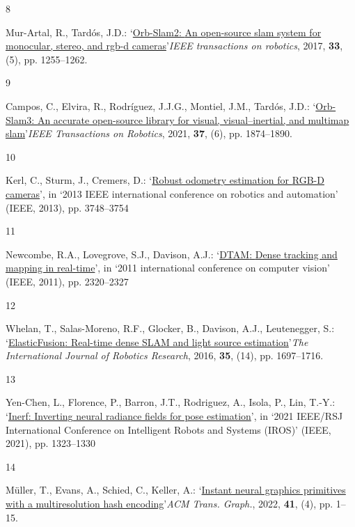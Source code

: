 \documentclass[twocolumn]{article} %
\newlength{\cslhangindent}
\newlength{\csllabelwidth}
\newenvironment{CSLReferences}[2] %
{\begin{list}{}{%
  \setlength{\itemindent}{0pt}
  \setlength{\leftmargin}{0pt}
  \setlength{\parsep}{0pt}
  \ifodd #1
  \setlength{\leftmargin}{\cslhangindent}
  \setlength{\itemindent}{-1\cslhangindent}
  \fi
  \setlength{\itemsep}{0.5\baselineskip}}}
{\end{list}}
\newcommand{\CSLLeftMargin}[1]{\parbox[t]{\csllabelwidth}{\strut#1\strut}}
\newcommand{\CSLRightInline}[1]{\parbox[t]{\linewidth - \csllabelwidth}{\strut#1\strut}}
\begin{document}
\begin{CSLReferences}{0}{1}
\CSLLeftMargin{8 }%
\CSLRightInline{Mur-Artal, R., Tardós, J.D.:
{`\href{https://doi.org/10.1109/TRO.2017.2705103}{Orb-Slam2: {An}
open-source slam system for monocular, stereo, and rgb-d
cameras}'}\emph{IEEE transactions on robotics}, 2017, \textbf{33}, (5),
pp. 1255--1262. }

\CSLLeftMargin{9 }%
\CSLRightInline{Campos, C., Elvira, R., Rodríguez, J.J.G., Montiel,
J.M., Tardós, J.D.:
{`\href{https://doi.org/10.1109/TRO.2021.3075644}{Orb-Slam3: {An}
accurate open-source library for visual, visual--inertial, and multimap
slam}'}\emph{IEEE Transactions on Robotics}, 2021, \textbf{37}, (6), pp.
1874--1890. }

\CSLLeftMargin{10 }%
\CSLRightInline{Kerl, C., Sturm, J., Cremers, D.:
{`\href{https://doi.org/10.1109/ICRA.2013.6631104}{Robust odometry
estimation for {RGB-D} cameras}'}, in {`2013 {IEEE} international
conference on robotics and automation'} (IEEE, 2013), pp. 3748--3754}

\CSLLeftMargin{11 }%
\CSLRightInline{Newcombe, R.A., Lovegrove, S.J., Davison, A.J.:
{`\href{https://doi.org/10.1109/ICCV.2011.6126513}{{DTAM}: {Dense}
tracking and mapping in real-time}'}, in {`2011 international conference
on computer vision'} (IEEE, 2011), pp. 2320--2327}

\CSLLeftMargin{12 }%
\CSLRightInline{Whelan, T., Salas-Moreno, R.F., Glocker, B., Davison,
A.J., Leutenegger, S.:
{`\href{https://doi.org/10.1177/0278364916669237}{{ElasticFusion}:
{Real-time} dense {SLAM} and light source estimation}'}\emph{The
International Journal of Robotics Research}, 2016, \textbf{35}, (14),
pp. 1697--1716. }

\CSLLeftMargin{13 }%
\CSLRightInline{Yen-Chen, L., Florence, P., Barron, J.T., Rodriguez, A.,
Isola, P., Lin, T.-Y.:
{`\href{https://doi.org/10.1109/IROS51168.2021.9636708}{Inerf:
{Inverting} neural radiance fields for pose estimation}'}, in {`2021
{IEEE}/{RSJ International Conference} on {Intelligent Robots} and
{Systems} ({IROS})'} (IEEE, 2021), pp. 1323--1330}

\CSLLeftMargin{14 }%
\CSLRightInline{Müller, T., Evans, A., Schied, C., Keller, A.:
{`\href{https://doi.org/10.1145/3528223.3530127}{Instant neural graphics
primitives with a multiresolution hash encoding}'}\emph{ACM Trans.
Graph.}, 2022, \textbf{41}, (4), pp. 1--15. }


\end{CSLReferences}
\end{document}
